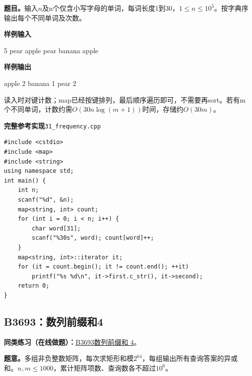 \documentclass[UTF8,11pt,a4paper,fontset=none]{ctexart}
\newcommand{\practice}[2]{\par\noindent\textbf{同类练习（在线做题）：}\href{https://www.luogu.com.cn/problem/#1}{#1\quad #2}。\par}
\begin{document}
\noindent\textbf{题目。}输入$n$及n个仅含小写字母的单词，每词长度1到30，$1\le n\le10^5$。按字典序输出每个不同单词及次数。
\begin{tcolorbox}[samplebox,title={输入输出样例}]
\textbf{样例输入}
\begin{Sample}
5
pear apple pear banana apple
\end{Sample}
\tcblower
\textbf{样例输出}
\begin{Sample}
apple 2
banana 1
pear 2
\end{Sample}
\end{tcolorbox}
读入时对键计数；map已经按键排列，最后顺序遍历即可，不需要再sort。若有m个不同单词，计数约需$O(30n\log(m+1))$时间，存储约$O(30m)$。
\par\noindent\begin{minipage}{\linewidth}
\textbf{完整参考实现}\quad\texttt{31\_frequency.cpp}
\begin{lstlisting}
#include <cstdio>
#include <map>
#include <string>
using namespace std;
int main() {
    int n;
    scanf("%d", &n);
    map<string, int> count;
    for (int i = 0; i < n; i++) {
        char word[31];
        scanf("%30s", word); count[word]++;
    }
    map<string, int>::iterator it;
    for (it = count.begin(); it != count.end(); ++it)
        printf("%s %d\n", it->first.c_str(), it->second);
    return 0;
}
\end{lstlisting}
\end{minipage}\par

\subsection{B3693：数列前缀和4}

\practice{B3693}{数列前缀和 4}

\noindent\textbf{题意。}多组非负整数矩阵，每次求矩形和模$2^{64}$，每组输出所有查询答案的异或和。$n,m\le1000$，累计矩阵项数、查询数各不超过$10^6$。
\end{document}
